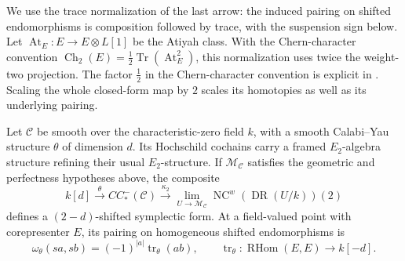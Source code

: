 We use the trace normalization of the last arrow: the induced pairing on shifted endomorphisms is composition followed by trace, with the suspension sign below.
Let $\operatorname{At}_E:E\to E\otimes L[1]$ be the Atiyah class.
With the Chern-character convention
$\operatorname{Ch}_2(E)=\tfrac12\operatorname{Tr}(\operatorname{At}_E^2)$, this normalization uses twice the weight-two projection.
The factor $\tfrac12$ in the Chern-character convention is explicit in
\cite[proof of Theorem~2.12]{PTVV}.
Scaling the whole closed-form map by $2$ scales its homotopies as well as its underlying pairing.

\begin{theorem}\label{cbc:cy:outputs}
Let $\mathcal C$ be smooth over the characteristic-zero field $k$, with a smooth Calabi--Yau structure $\theta$ of dimension $d$.
Its Hochschild cochains carry a framed $E_2$-algebra structure refining their usual $E_2$-structure.
If $\mathcal M_{\mathcal C}$ satisfies the geometric and perfectness hypotheses above, the composite
\[
 k[d]\xrightarrow{\theta}CC^-_*(\mathcal C)
       \xrightarrow{\kappa_2}
 \lim_{U\to\mathcal M_{\mathcal C}}
       \operatorname{NC}^{w}(\operatorname{DR}(U/k))(2)
\]
defines a $(2-d)$-shifted symplectic form.
At a field-valued point with corepresenter $E$, its pairing on homogeneous shifted endomorphisms is
\begin{equation}\label{cbc:cy:shifted-trace}
 \omega_\theta(sa,sb)=(-1)^{|a|}\operatorname{tr}_\theta(ab),
 \qquad
 \operatorname{tr}_\theta:\operatorname{RHom}(E,E)\to k[-d].
\end{equation}
\end{theorem}
